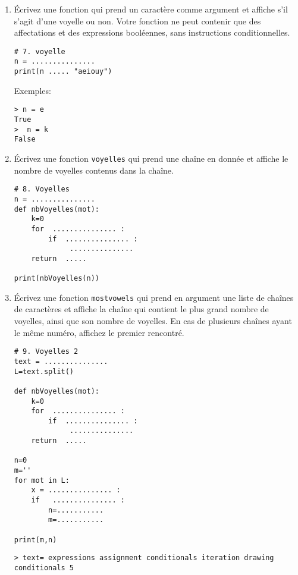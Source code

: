 \documentclass[a4paper]{article}
\begin{document}
\begin{enumerate}
\item Écrivez une fonction qui prend un caractère comme argument et affiche s'il s'agit d'une voyelle ou non.
Votre fonction ne peut contenir que des affectations et des expressions booléennes, sans instructions conditionnelles.
\begin{lstlisting}
# 7. voyelle
n = ...............
print(n ..... "aeiouy")
\end{lstlisting}
Exemples:
\begin{verbatim}
> n = e
True
>  n = k
False
\end{verbatim}

\item Écrivez une fonction {\tt voyelles} qui prend une chaîne en donnée et affiche le nombre de voyelles contenus dans la chaîne.

\begin{lstlisting}
# 8. Voyelles
n = ...............
def nbVoyelles(mot):
    k=0
    for  ............... :
        if  ............... :
             ...............
    return  .....

print(nbVoyelles(n))
\end{lstlisting}

\item Écrivez une fonction {\tt mostvowels} qui prend en argument une liste de chaînes de caractères et affiche la chaîne qui contient le plus grand nombre de voyelles, ainsi que son nombre de voyelles. En cas de plusieurs chaînes ayant le même numéro, affichez le premier rencontré.
\begin{lstlisting}
# 9. Voyelles 2
text = ...............
L=text.split()

def nbVoyelles(mot):
    k=0
    for  ............... :
        if  ............... :
             ...............
    return  .....

n=0
m=''
for mot in L:
    x = ............... :
    if   ............... :
        n=...........
        m=...........

print(m,n)
\end{lstlisting}

\begin{verbatim}
> text= expressions assignment conditionals iteration drawing
conditionals 5
\end{verbatim}


\end{enumerate}
\end{document}
